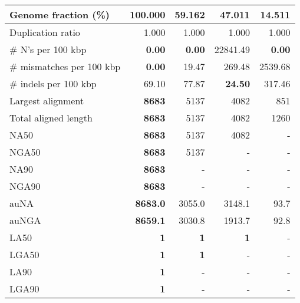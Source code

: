 \documentclass[12pt,a4paper]{article}
\begin{document}
\begin{table}[ht]
\begin{center}
\begin{tabular}{|l*{4}{|r}|}
Genome fraction (\%) & {\bf 100.000} & 59.162 & 47.011 & 14.511 \\ \hline
Duplication ratio & 1.000 & 1.000 & 1.000 & 1.000 \\ \hline
\# N's per 100 kbp & {\bf 0.00} & {\bf 0.00} & 22841.49 & {\bf 0.00} \\ \hline
\# mismatches per 100 kbp & {\bf 0.00} & 19.47 & 269.48 & 2539.68 \\ \hline
\# indels per 100 kbp & 69.10 & 77.87 & {\bf 24.50} & 317.46 \\ \hline
Largest alignment & {\bf 8683} & 5137 & 4082 & 851 \\ \hline
Total aligned length & {\bf 8683} & 5137 & 4082 & 1260 \\ \hline
NA50 & {\bf 8683} & 5137 & 4082 & - \\ \hline
NGA50 & {\bf 8683} & 5137 & - & - \\ \hline
NA90 & {\bf 8683} & - & - & - \\ \hline
NGA90 & {\bf 8683} & - & - & - \\ \hline
auNA & {\bf 8683.0} & 3055.0 & 3148.1 & 93.7 \\ \hline
auNGA & {\bf 8659.1} & 3030.8 & 1913.7 & 92.8 \\ \hline
LA50 & {\bf 1} & {\bf 1} & {\bf 1} & - \\ \hline
LGA50 & {\bf 1} & {\bf 1} & - & - \\ \hline
LA90 & {\bf 1} & - & - & - \\ \hline
LGA90 & {\bf 1} & - & - & - \\ \hline
\end{tabular}
\end{center}
\end{table}
\end{document}

